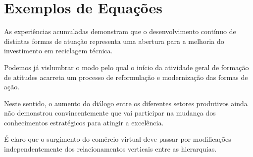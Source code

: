 \documentclass[fleqn]{icat-ufal}
\begin{document}
\section{Exemplos de Equações}
\label{sec:exemplos_equacoes}

As experiências acumuladas demonstram que o desenvolvimento contínuo de
distintas formas de atuação representa uma abertura para a melhoria do
investimento em reciclagem técnica.

Podemos já vislumbrar o modo pelo qual o
início da atividade geral de formação de atitudes acarreta um processo de
reformulação e modernização das formas de ação. 

Neste sentido, o aumento do
diálogo entre os diferentes setores produtivos ainda não demonstrou
convincentemente que vai participar na mudança dos conhecimentos estratégicos
para atingir a excelência. 

É claro que o surgimento do comércio virtual deve
passar por modificações independentemente dos relacionamentos verticais entre as
hierarquias. 
\end{document}
